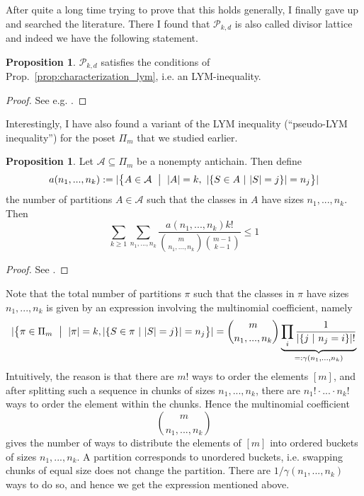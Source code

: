 \documentclass{scrartcl}
\theoremstyle{definition}
\newtheorem{proposition}[definition]{Proposition}
\begin{document}
After quite a long time trying to prove that this holds generally, I finally gave up and searched the literature.
There I found that $\mathcal{P}_{k, d}$ is also called divisor lattice and indeed we have the following statement.
\begin{proposition}
    $\mathcal{P}_{k, d}$ satisfies the conditions of Prop.~\ref{prop:characterization_lym}, i.e. an LYM-inequality.
\end{proposition}
\begin{proof}
    See e.g. \cite[Theorem 4.2.3]{anderson}.
\end{proof}
Interestingly, I have also found a variant of the LYM inequality (``pseudo-LYM inequality'') for the poset $\Pi_m$ that we studied earlier.
\begin{proposition}
    Let $\mathcal{A} \subseteq \Pi_m$ be a nonempty antichain. Then define
    \begin{equation*}
        a(n_1, ..., n_k) := |\bigl\{ A \in \mathcal{A} \ \bigm| \ |A| = k, \ |\{ S \in A \ | \ |S| = j \}| = n_j \bigr\}|
    \end{equation*}
    the number of partitions $A \in \mathcal{A}$ such that the classes in $A$ have sizes $n_1, ..., n_k$.
    Then
    \begin{equation*}
        \sum_{k \geq 1} \sum_{n_1, ..., n_k} \frac {a(n_1, ..., n_k) k!} {{m \choose n_1, ..., n_k} {m - 1 \choose k - 1}} \leq 1
    \end{equation*}
\end{proposition}
\begin{proof}
    See \cite{lym_partitions}.
\end{proof}
Note that the total number of partitions $\pi$ such that the classes in $\pi$ have sizes $n_1, ..., n_k$ is given by an expression involving the multinomial coefficient, namely
\begin{equation*}
    |\bigl\{ \pi \in \Pi_m \ \bigm| \ |\pi| = k, |\{ S \in \pi \ | \ |S| = j\}| = n_j \bigr\}| = {m \choose n_1, ..., n_k} \underbrace{ \prod_i \frac 1 {|\{ j \ | \ n_j = i\}|!} }_{=: \gamma(n_1, ..., n_k)}
\end{equation*}
Intuitively, the reason is that there are $m!$ ways to order the elements $[m]$, and after splitting such a sequence in chunks of sizes $n_1, ..., n_k$, there are $n_1! \cdot ... \cdot n_k!$ ways to order the element within the chunks.
Hence the multinomial coefficient
\begin{equation*}
    {m \choose n_1, ..., n_k}
\end{equation*}
gives the number of ways to distribute the elements of $[m]$ into ordered buckets of sizes $n_1, ..., n_k$.
A partition corresponds to unordered buckets, i.e. swapping chunks of equal size does not change the partition.
There are $1/\gamma(n_1, ..., n_k)$ ways to do so, and hence we get the expression mentioned above.
\end{document}
